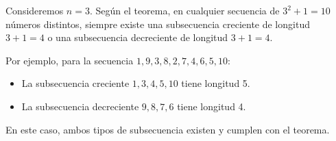 \documentclass[11pt]{scrartcl}
\begin{document}
Consideremos \(n = 3\). Según el teorema, en cualquier secuencia de \(3^2 + 1 = 10\) números distintos, siempre existe una subsecuencia creciente de longitud \(3 + 1 = 4\) o una subsecuencia decreciente de longitud \(3 + 1 = 4\).

Por ejemplo, para la secuencia \(1, 9, 3, 8, 2, 7, 4, 6, 5, 10\):
\begin{itemize}
    \item La subsecuencia creciente \(1, 3, 4, 5, 10\) tiene longitud 5.
    \item La subsecuencia decreciente \(9, 8, 7, 6\) tiene longitud 4.
\end{itemize}

En este caso, ambos tipos de subsecuencia existen y cumplen con el teorema.
\end{document}
